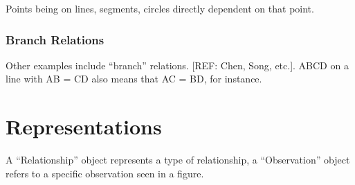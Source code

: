 Points being on lines, segments, circles directly dependent on that point.

\subsubsection{Branch Relations}

Other examples include ``branch'' relations. [REF: Chen, Song,
  etc.]. ABCD on a line with AB = CD also means that AC = BD, for instance.

\section{Representations}

A ``Relationship'' object represents a type of relationship, a
``Observation'' object refers to a specific observation seen in a figure.
